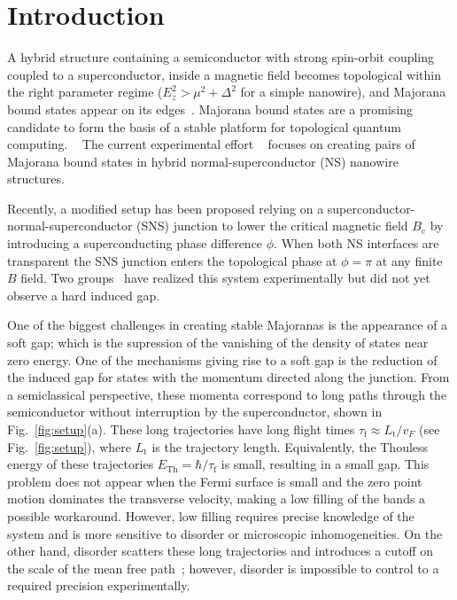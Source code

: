 \documentclass[english, twocolumn, 10pt, aps, superscriptaddress, floatfix, prb, citeautoscript]{revtex4-1}
\renewcommand{\comment}[2]{#2}
\begin{document}
\section{Introduction}
\comment{Hybrid NS structures become topological and are useful for TQC.}
A hybrid structure containing a semiconductor with strong spin-orbit coupling coupled to a superconductor, inside a magnetic field becomes topological within the right parameter regime ($E_z^2>\mu^2+\Delta^2$ for a simple nanowire), and Majorana bound states appear on its edges~\cite{lutchyn_majorana_2010,oreg_helical_2010}.
Majorana bound states are a promising candidate to form the basis of a stable platform for topological quantum computing. ~\cite{alicea2012new,beenakker2013search}
The current experimental effort ~\cite{mourik_signatures_2012,das_zero-bias_2012,deng_anomalous_2012,churchill_superconductor-nanowire_2013,zhang2018quantized} focuses on creating pairs of Majorana bound states in hybrid normal-superconductor (NS) nanowire structures.

\comment{SNS junctions also work and require smaller field.}
Recently, a modified setup has been proposed\cite{pientka2017topological,hell2017two} relying on a superconductor-normal-superconductor (SNS) junction to lower the critical magnetic field $B_\textrm{c}$ by introducing a superconducting phase difference $\phi$.
When both NS interfaces are transparent the SNS junction enters the topological phase at $\phi=\pi$ at any finite $B$ field.
Two groups~\cite{fornieri_evidence_2018,ren_topological_2018} have realized this system experimentally but did not yet observe a hard induced gap.

\comment{The gap is small because of long trajectories.}
One of the biggest challenges in creating stable Majoranas is the appearance of a soft gap; which is the supression of the vanishing of the density of states near zero energy.
One of the mechanisms giving rise to a soft gap is the reduction of the induced gap for states with the momentum directed along the junction.
From a semiclassical perspective, these momenta correspond to long paths through the semiconductor without interruption by the superconductor, shown in Fig.~\ref{fig:setup}(a).
These long trajectories have long flight times $\tau_\textrm{f} \approx L_\textrm{t} / v_F$ (see Fig.~\ref{fig:setup}), where $L_\textrm{t}$ is the trajectory length.
Equivalently, the Thouless energy of these trajectories $E_{\textrm{Th}}=\hbar / \tau_\textrm{f}$ is small, resulting in a small gap.
This problem does not appear when the Fermi surface is small and the zero point motion dominates the transverse velocity, making a low filling of the bands a possible workaround\cite{nijholt2015orbital}.
However, low filling requires precise knowledge of the system and is more sensitive to disorder or microscopic inhomogeneities.
On the other hand, disorder scatters these long trajectories and introduces a cutoff on the scale of the mean free path~\cite{haim_double-edge_2018}; however, disorder is impossible to control to a required precision experimentally.
\end{document}
